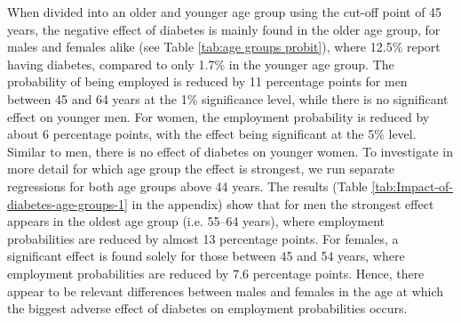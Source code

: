 When divided into an older and younger age group using the
cut-off point of 45 years, the negative effect of diabetes is mainly
found in the older age group, for males and females alike (see Table
\ref{tab:age groups probit}), where 12.5\% report having diabetes,
compared to only 1.7\% in the younger age group. The probability
of being employed is reduced by 11 percentage points for men
between 45 and 64 years at the 1\% significance level, while
there is no significant effect on younger men. For women, the employment
probability is reduced by about 6 percentage points, with the effect
being significant at the 5\% level. Similar to men, there
is no effect of diabetes on younger women. To investigate in more
detail for which age group the effect is strongest, we run separate
regressions for both age groups above 44 years. The results (Table
\ref{tab:Impact-of-diabetes-age-groups-1} in the appendix) show that
for men the strongest effect appears in the oldest age group (i.e.
55--64 years), where employment probabilities are reduced by almost 13 percentage
points. For females, a significant effect is found solely for those
between 45 and 54 years, where employment probabilities are reduced by 7.6
percentage points. Hence, there appear to be relevant differences
between males and females in the age at which the biggest adverse
effect of diabetes on employment probabilities occurs. 
\afterpage{\clearpage}
